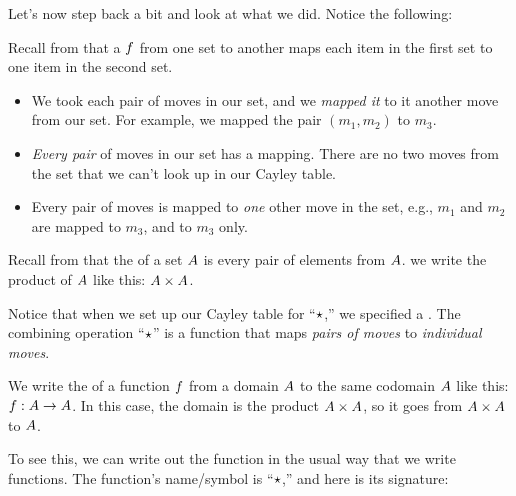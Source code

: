 \documentclass[../../../main.tex]{subfiles}
\begin{document}
Let's now step back a bit and look at what we did. Notice the following:

\begin{aside}
  \begin{remark}
    Recall from  that a  $f$ from one set to another maps each item in the first set to one item in the second set.
  \end{remark}
\end{aside}

\begin{itemize}
  \item We took each pair of moves in our set, and we \emph{mapped it} to it another move from our set. For example, we mapped the pair $(m_{1}, m_{2})$ to $m_{3}$.
  \item \emph{Every pair} of moves in our set has a mapping. There are no two moves from the set that we can't look up in our Cayley table.
  \item Every pair of moves is mapped to \emph{one} other move in the set, e.g., $m_{1}$ and $m_{2}$ are mapped to $m_{3}$, and to $m_{3}$ only.
\end{itemize}

\begin{aside}
  \begin{notation}
    Recall from  that the  of a set $A$ is every pair of elements from $A$. we write the product of $A$ like this: $A \times A$.
  \end{notation}
\end{aside}

Notice that when we set up our Cayley table for ``$\opSymbol/$,'' we specified a . The combining operation ``$\opSymbol/$'' is a function that maps \emph{pairs of moves} to \emph{individual moves}. 

\begin{aside}
  \begin{notation}
    We write the  of a function $f$ from a domain $A$ to the same codomain $A$ like this: $f: A \rightarrow A$. In this case, the domain is the product $A \times A$, so it goes from $A \times A$ to $A$.
  \end{notation}
\end{aside}

To see this, we can write out the function in the usual way that we write functions. The function's name/symbol is ``$\opSymbol/$,'' and here is its signature:
\end{document}
